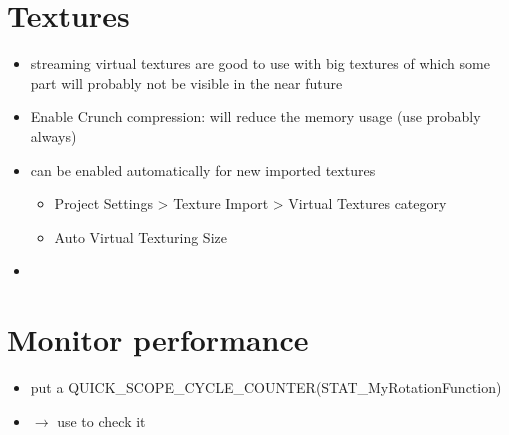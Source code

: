     \section{Textures}
        \begin{itemize}
            \item streaming virtual textures are good to use with big textures of which some part will probably not be visible in the near future
            \item Enable Crunch compression: will reduce the memory usage (use probably always)
            \item can be enabled automatically for new imported textures
            \begin{itemize}
                \item Project Settings > Texture Import > Virtual Textures category 
                \item Auto Virtual Texturing Size
            \end{itemize}
            \item 
        \end{itemize}


    \section{Monitor performance}
        \begin{itemize}
            \item put a QUICK\_SCOPE\_CYCLE\_COUNTER(STAT\_MyRotationFunction)
            \item $\rightarrow$ use  to check it
        \end{itemize}


